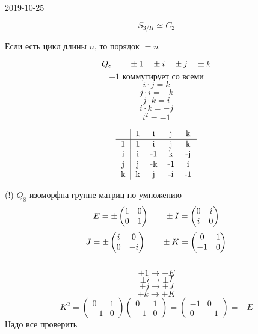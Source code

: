 \documentclass[12pt, fleqn]{article}
\begin{document}
\begin{lect} {2019-10-25}
\begin{task}[3]
    \[S_{3/H} \simeq C_2\] 
\end{task}

\begin{utv}
    Если есть цикл длины $n$, то порядок $= n$
\end{utv}

\begin{Reminder}
    \[Q_8 \qquad \pm 1 \quad \pm i \quad \pm j \quad \pm k\]
    \[-1 \text{ коммутирует со всеми}\]
    \[i \cdot j = k\]
    \[j \cdot i = -k\]
    \[j \cdot k = i\]
    \[i \cdot k = -j\]
    \[i^2 = -1\]

    \[\begin{tabular} {c|c c c c}
        &  1 & i & j & k\\ \hline
        1   &  1  & i & j & k\\
        i & i & -1 & k & -j\\
        j & j & -k & -1 & i\\
        k & k & j & -i & -1
    \end{tabular}\]
\end{Reminder}

\begin{task}[4]
    (!) \q $Q_8$ изоморфна группе матриц по умножению
    \[E = \pm \begin{pmatrix}
        1 & 0\\
        0 & 1
    \end{pmatrix} \qquad \pm I = \begin{pmatrix}
        0 & i\\
        i  &0
    \end{pmatrix}\]
    \[J = \pm\begin{pmatrix}
        i & 0\\
        0 & -i
    \end{pmatrix} \qquad \pm K = \begin{pmatrix}
        0 & 1\\
        -1 & 0
    \end{pmatrix}\]
    \\
    \[\pm 1 \to \pm E\]
    \[\pm i \to \pm I\]
    \[\pm j \to \pm J\]
    \[\pm k \to \pm K\]
    \[K^2 = \begin{pmatrix}
        0 & 1\\
        -1 & 0
    \end{pmatrix} \begin{pmatrix}
        0 & 1\\
        -1 & 0
    \end{pmatrix} = \begin{pmatrix}
        -1 & 0\\
         0 & -1
    \end{pmatrix} = -E\]
    Надо все проверить\\ 
\end{task}


\end{lect}
\end{document}
